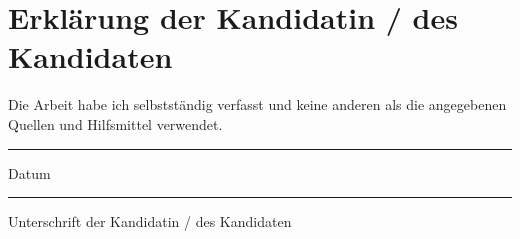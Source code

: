 \chapter{Erklärung der Kandidatin / des Kandidaten}

\begin{description}[$\Box$~]
\item[$\Box$] Die Arbeit habe ich selbstständig verfasst und keine anderen als die angegebenen Quellen und Hilfsmittel verwendet.
\end{description}

\vspace{2cm}

\begin{minipage}[t]{3cm}
\rule{3cm}{0.5pt}
Datum
\end{minipage}
\hfill
\begin{minipage}[t]{9cm}
\rule{9cm}{0.5pt}
Unterschrift der Kandidatin / des Kandidaten
\end{minipage}